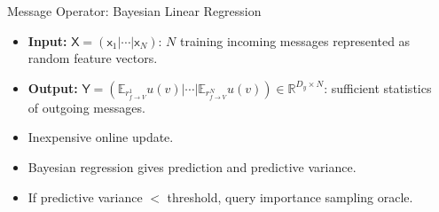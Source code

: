\documentclass[english]{beamer}
\newcommand{\factor}{f}				%
\newcommand{\outV}{V}                         %
\begin{document}
\begin{frame}
\begin{columns}[t]
\begin{itemize}
\end{itemize}
%
%
\begin{block}{Message Operator: Bayesian Linear Regression }

\begin{itemize}
    \item \textbf{Input:} $\mathsf{X}=\left(\mathsf{x}_{1}|\cdots|\mathsf{x}_{N}\right)$: 
        $N$ training incoming messages represented as random feature vectors.
    \item \textbf{Output:} $\mathsf{Y}=\left(\mathbb{E}_{r_{\factor\rightarrow
        \outV}^{1}}u(v)|\cdots|\mathbb{E}_{r_{f\rightarrow
        \outV}^{N}}u(v)\right)\in\mathbb{R}^{D_{y}\times N}$: 
        sufficient statistics of outgoing messages.
    \item Inexpensive online update.
    \item Bayesian regression gives prediction and predictive variance.
    \item If predictive variance $<$ threshold, query importance sampling oracle.
\end{itemize}

%


\end{block}
\end{columns}
\end{frame}
\end{document}
